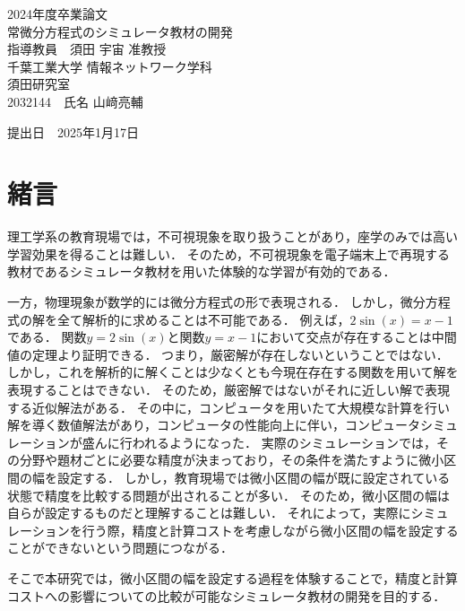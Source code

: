 \documentclass[a4paper, 12pt]{ltjsarticle}
\newcommand{\coverpage}{
\begin{titlepage}
\begin{center}
\vspace*{1.5cm}

{\LARGE 2024年度卒業論文}\\[2cm] %

{\Huge {常微分方程式のシミュレータ教材の開発}}\\[4cm] %

{\LARGE 指導教員　須田 宇宙 准教授}\\[2cm] %
{\LARGE 千葉工業大学 情報ネットワーク学科}\\[0.5cm] %

{\LARGE 須田研究室}\\[2.5cm] %

{\LARGE {2032144}　氏名 {山﨑亮輔}} \\[1.5cm] %

\vfill
\end{center}

\begin{flushright}
{\LARGE 提出日　\textnormal{2025年1月17日}}\\[1.5cm] %
\end{flushright}

\vfill
\end{titlepage}
}
\begin{document}
\coverpage

\tableofcontents

\clearpage

\section{緒言}
理工学系の教育現場では，不可視現象を取り扱うことがあり，座学のみでは高い学習効果を得ることは難しい．
そのため，不可視現象を電子端末上で再現する教材であるシミュレータ教材を用いた体験的な学習が有効的である\cite{suda2018}．

一方，物理現象が数学的には微分方程式の形で表現される．
しかし，微分方程式の解を全て解析的に求めることは不可能である．
例えば，$2\sin(x)=x-1$である．
関数$y=2\sin(x)$と関数$y=x-1$において交点が存在することは中間値の定理より証明できる．
つまり，厳密解が存在しないということではない．
しかし，これを解析的に解くことは少なくとも今現在存在する関数を用いて解を表現することはできない．
そのため，厳密解ではないがそれに近しい解で表現する近似解法がある．
その中に，コンピュータを用いたて大規模な計算を行い解を導く数値解法があり，コンピュータの性能向上に伴い，コンピュータシミュレーションが盛んに行われるようになった．
実際のシミュレーションでは，その分野や題材ごとに必要な精度が決まっており，その条件を満たすように微小区間の幅を設定する．
しかし，教育現場では微小区間の幅が既に設定されている状態で精度を比較する問題が出されることが多い．
そのため，微小区間の幅は自らが設定するものだと理解することは難しい．
それによって，実際にシミュレーションを行う際，精度と計算コストを考慮しながら微小区間の幅を設定することができないという問題につながる．

そこで本研究では，微小区間の幅を設定する過程を体験することで，精度と計算コストへの影響についての比較が可能なシミュレータ教材の開発を目的する．
\clearpage
\end{document}
